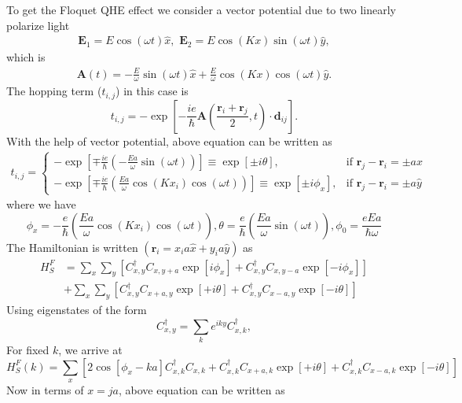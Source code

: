 \documentclass[aps,pra,preprint,showpacs]{revtex4-1}
\begin{document}
To get the Floquet QHE effect we consider a vector potential due to two linearly polarize light
\begin{eqnarray}
	\bm E_1 = E \cos(\omega t) \hat{x},\,\, \bm E_2 = E\cos(Kx) \sin(\omega t) \hat{y},
\end{eqnarray}
which is 
\begin{eqnarray}
	\bm A(t) = -\frac{E}{\omega} \sin(\omega t) \hat{x} + \frac{E}{\omega} \cos(Kx) \cos(\omega t) \hat{y}.
\end{eqnarray}
The hopping term ($t_{i,j}$) in this case is
\begin{equation}
	t_{i,j}=-\exp\left[  -\frac{ie}{\hbar}\bm A(\frac{\bm{r}
		_{i}+\bm{r}_{j}}{2}, t) \cdot \bm d_{ij}\right]  .
\end{equation}
With the help of vector potential, above equation can be written as
\begin{eqnarray}
	t_{i,j} = \begin{cases}
		-\exp\left[  \mp\frac
		{ie}{\hbar}\left(  \bm{-}\frac{Ea}{\omega}\sin(\omega t)\right)
		\right]  \equiv\exp\left[  \pm i\theta\right] ,& \text{if } \bm{r}_{j}-\bm{r}_{i}=\pm a \hat{x}\\
		-\exp\left[  \mp\frac
		{ie}{\hbar}\left(  \frac{Ea}{\omega}\cos(Kx_{i})\cos(\omega t)\right)
		\right]  \equiv\exp\left[  \pm i\phi_{x}\right], & \text{if } \bm{r}_{j}-\bm{r}_{i}=\pm a \hat{y} 
	\end{cases}
\end{eqnarray}
where we have
\begin{equation}
	\phi_{x}=-\frac{e}{\hbar}\left(  \frac{Ea}{\omega}\cos(Kx_{i})\cos(\omega
	t)\right)  ,\theta=\frac{e}{\hbar}\left(  \frac{Ea}{\omega}\sin(\omega
	t)\right)  ,\phi_{0}=\frac{eEa}{\hbar\omega}
\end{equation}
The Hamiltonian is written $(\bm r_{i} = x_i a \hat{x} + y_i a \hat{y})$ as
\begin{align}
	H_{S}^{F} &  =
	{\displaystyle\sum\limits_{x}}
	{\displaystyle\sum\limits_{y}}
	\left[  C_{x,y}^{\dagger}C_{x,y+a}\exp\left[  i\phi_{x}\right]  +C_{x,y}
	^{\dagger}C_{x,y-a}\exp\left[  -i\phi_{x}\right]  \right]  \\
	&  +
	{\displaystyle\sum\limits_{x}}
	{\displaystyle\sum\limits_{y}}
	\left[  C_{x,y}^{\dagger}C_{x+a,y}\exp\left[  +i\theta\right]  +C_{x,y}
	^{\dagger}C_{x-a,y}\exp\left[  -i\theta\right]  \right]  \nonumber
\end{align}
Using eigenstates of the form
\begin{equation}
	C_{x,y}^{\dagger}=
	{\displaystyle\sum\limits_{k}}
	e^{iky}C_{x,k}^{\dagger},
\end{equation}
For fixed $k$, we arrive at
\begin{equation}
	H_{S}^{F}(k)=
	{\displaystyle\sum\limits_{x}}
	\left[  2\cos[\phi_{x}-ka]C_{x,k}^{\dagger}C_{x,k}+C_{x,k}^{\dagger}
	C_{x+a,k}\exp\left[  +i\theta\right]  +C_{x,k}^{\dagger}C_{x-a,k}\exp\left[
	-i\theta\right]  \right]
\end{equation}
Now in terms of $x=ja$, above equation can be written as
\end{document}
